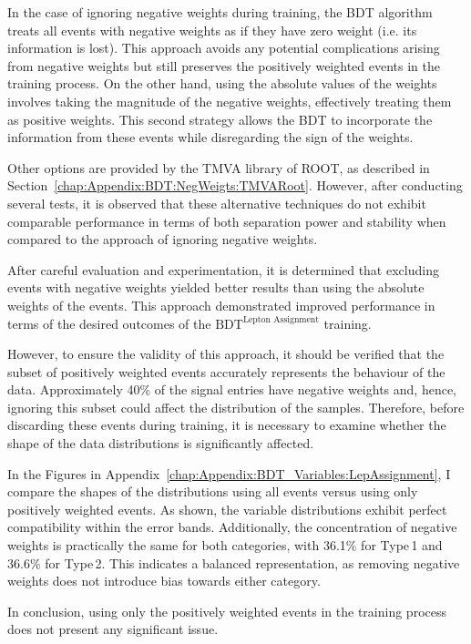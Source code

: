 In the case of ignoring negative weights during training, the BDT algorithm treats all 
events with negative weights as if they have zero weight (i.e. its information is lost). 
This approach avoids any potential complications arising from negative weights but 
still preserves the positively weighted events in the training process. On the other hand, 
using the absolute values of the weights involves taking the magnitude of the negative weights, 
effectively treating them as positive weights. This second strategy allows the BDT to 
incorporate the information from these events while disregarding the sign of the weights.

Other options are provided by the TMVA library of ROOT, as described in 
Section~\ref{chap:Appendix:BDT:NegWeigts:TMVARoot}. However, after conducting several tests, 
it is observed that these alternative techniques do not exhibit comparable performance 
in terms of both separation power and stability when compared to the approach of ignoring 
negative weights.

After careful evaluation and experimentation, it is determined that excluding events with 
negative weights yielded better results than using the absolute weights of the events. This 
approach demonstrated improved performance in terms of the desired outcomes of the
$\text{BDT}^{\text{Lepton Assignment}}$ training.

However, to ensure the validity of this approach, it should be verified that the subset of positively 
weighted events accurately represents the behaviour of the data. Approximately 40\% of the signal 
entries have negative weights and, hence, ignoring this subset could affect the distribution of the samples. 
Therefore, before discarding these events during training, it is necessary to examine whether the 
shape of the data distributions is significantly affected.

In the Figures in Appendix~\ref{chap:Appendix:BDT_Variables:LepAssignment}, I 
compare the shapes of the distributions
using all events versus using only positively weighted events. As shown, the variable distributions exhibit 
perfect compatibility within the error bands. Additionally, the concentration of negative weights is practically 
the same for both categories, with 36.1\% for Type$\,$1 and 36.6\% for Type$\,$2. This indicates a balanced
representation, as removing negative weights does not introduce bias towards either category.

In conclusion, using only the positively weighted events in the training 
process does not present any significant issue.






